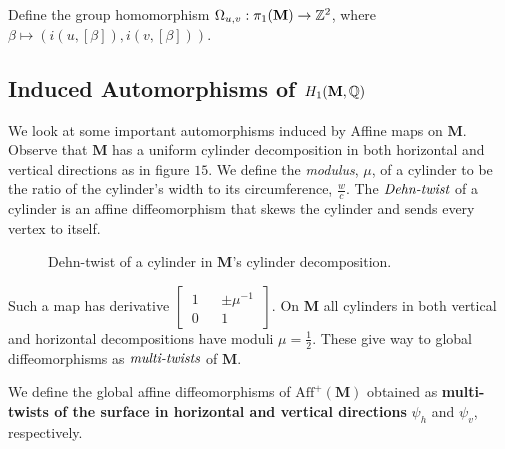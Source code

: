 \documentclass[]{article}
\def\bM{\mathbf{M}}
\begin{document}
\begin{Def}
Define the group homomorphism $\Omega_{u,v}:\pi_1(\bM)\rightarrow \ZZ^2$, where $\beta\mapsto(i(u,[\beta]),i(v,[\beta]))$.
\end{Def}

\begin{lem}
\end{lem}

\subsection{Induced Automorphisms of $H_1(\bM,\QQ)$}
We look at some important automorphisms induced by Affine maps on $\bM$. Observe that $\bM$ has a uniform cylinder decomposition in both horizontal and vertical directions as in figure $15$. We define the \emph{modulus}, $\mu$, of a cylinder to be the ratio of the cylinder's width to its circumference, $\frac{w}{c}$. The $\emph{Dehn-twist}$ of a cylinder is an affine diffeomorphism that skews the cylinder and sends every vertex to itself.

\begin{figure}[H]
\centering

\label{fig:skew}
\caption{Dehn-twist of a cylinder in $\bM$'s cylinder decomposition.}
\end{figure}

Such a map has derivative $\left[~\begin{matrix}1 && \pm\mu^{-1}\\0 && 1\end{matrix}~\right]$. On $\bM$ all cylinders in both vertical and horizontal decompositions have moduli $\mu=\frac{1}{2}$. These give way to global diffeomorphisms as $\emph{multi-twists}$ of $\bM$.

\begin{Def}
We define the global affine diffeomorphisms of $\text{Aff}^+(\bM)$ obtained as \textbf{multi-twists of the surface in horizontal and vertical directions} $\psi_h$ and $\psi_v$, respectively.
\end{Def}
\end{document}
